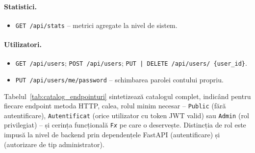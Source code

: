 \documentclass[../../main.tex]{subfiles}
\begin{document}
\paragraph*{Statistici.}
\begin{itemize}
    \item \texttt{GET /api/stats} -- metrici agregate la nivel de sistem.
\end{itemize}

\paragraph*{Utilizatori.}
\begin{itemize}
    \item \texttt{GET /api/users}; \texttt{POST /api/users}; \texttt{PUT\,|\,DELETE /api/users/ \linebreak \{user\_id\}}.
    \item \texttt{PUT /api/users/me/password} -- schimbarea parolei contului propriu.
\end{itemize}

Tabelul~\ref{tab:catalog_endpointuri} sintetizează catalogul complet, indicând pentru fiecare endpoint metoda HTTP, calea, rolul minim necesar -- \texttt{Public} (fără autentificare), \texttt{Autentificat} (orice utilizator cu token JWT valid) sau \texttt{Admin} (rol privilegiat) -- și cerința funcțională \texttt{F\textit{x}} pe care o deservește. Distincția de rol este impusă la nivel de backend prin dependențele FastAPI  (autentificare) și  (autorizare de tip administrator).
\end{document}
